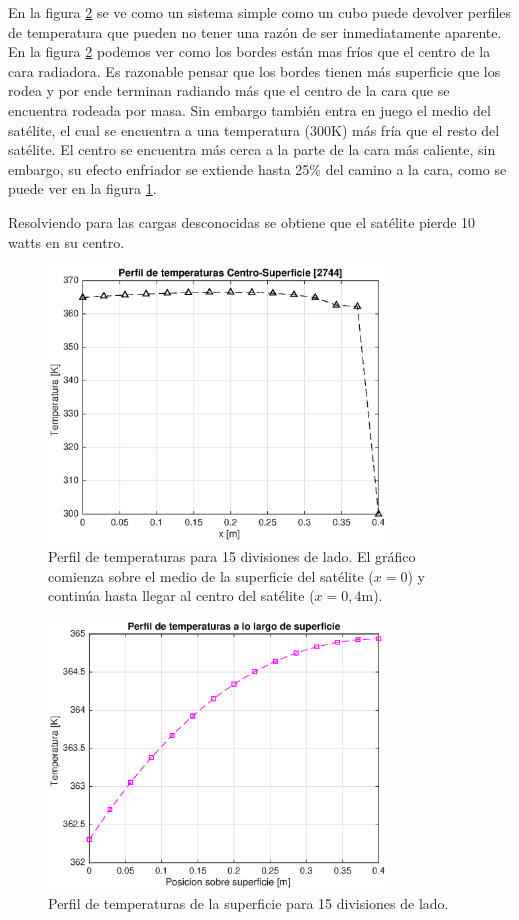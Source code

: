 \documentclass[onecolumn,10pt,titlepage,a4paper]{article}
\begin{document}
En la figura \ref{fig:perfilsurf15} se ve como un sistema simple como un cubo puede devolver perfiles de temperatura que pueden no tener una razón de ser inmediatamente aparente. En la figura \ref{fig:perfilsurf15} podemos ver como los bordes están mas fríos que el centro de la cara radiadora. Es razonable pensar que los bordes tienen más superficie que los rodea y por ende terminan radiando más que el centro de la cara que se encuentra rodeada por masa. Sin embargo también entra en juego el medio del satélite, el cual se encuentra a una temperatura (300K) más fría que el resto del satélite. El centro se encuentra más cerca a la parte de la cara más caliente, sin embargo, su efecto enfriador se extiende hasta 25\% del camino a la cara, como se puede ver en la figura \ref{fig:perfil15}. 

Resolviendo para las cargas desconocidas se obtiene que el satélite pierde 10 watts en su centro.
\begin{figure}[htb!]
	\centering
	\includegraphics[width=0.8\textwidth]{fig/perfil13.eps}
	\caption{Perfil de temperaturas para 15 divisiones de lado. El gráfico comienza sobre el medio de la superficie del satélite ($x=0$) y continúa hasta llegar al centro del satélite ($x=0,4$m).  }
	\label{fig:perfil15}
\end{figure}
\begin{figure}[htb!]
	\centering
	\includegraphics[width=0.8\textwidth]{fig/perfilsurf15.eps}
	\caption{Perfil de temperaturas de la superficie para 15 divisiones de lado. }
	\label{fig:perfilsurf15}
\end{figure}
\end{document}
